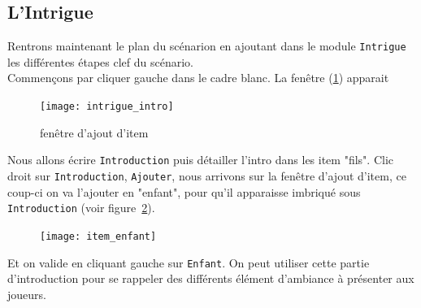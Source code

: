\documentclass[a4paper,12pt]{article}
\newcommand*{\interfaceitem}[1]{\texttt{#1}}
\begin{document}
\subsection{L'Intrigue}
Rentrons maintenant le plan du scénarion en ajoutant dans le module \interfaceitem{Intrigue} les différentes étapes clef du scénario.
\\
Commençons par cliquer gauche dans le cadre blanc. La fenêtre (\ref{intrigue_scenario}) apparait 
\begin{figure}[h!]
    \texttt{[image: intrigue\_intro]}
    \caption{fenêtre d'ajout d'item}
    \label{intrigue_scenario}
\end{figure}
Nous allons écrire \interfaceitem{Introduction} puis détailler l'intro dans les item "fils".
Clic droit sur \interfaceitem{Introduction}, \interfaceitem{Ajouter}, nous arrivons sur la fenêtre d'ajout d'item, ce coup-ci on va l'ajouter en "enfant", pour qu'il apparaisse imbriqué sous \interfaceitem{Introduction} (voir figure~\ref{item_enfant}).
\begin{figure}[h!]
    \texttt{[image: item\_enfant]}
    \label{item_enfant}
\end{figure}
Et on valide en cliquant gauche sur \interfaceitem{Enfant}.
On peut utiliser cette partie d'introduction pour se rappeler des différents élément d'ambiance à présenter aux joueurs.
\end{document}
